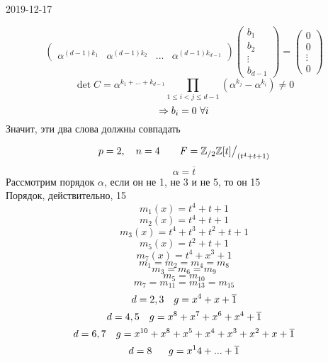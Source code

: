 \documentclass[12pt, fleqn]{article}
\begin{document}
\begin{lect}{2019-12-17}
\begin{Definition}
\[\begin{pmatrix}
            \\
            \alpha^{(d - 1)k_1} & \alpha^{(d - 1)k_2} & ... & \alpha^{(d - 1)k_{d - 1} }   
        \end{pmatrix} \begin{pmatrix}
            b_1\\
            b_2\\
            \vdots\\
            b_{d - 1} 
        \end{pmatrix} = \begin{pmatrix}
            0\\
            0\\
            \vdots\\
            0
        \end{pmatrix}\]
        \[\det C = \alpha^{k_1 + ... + k_{d - 1} } \prod_{1 \leq i < j \leq d - 1}(\alpha^{k_j} - \alpha^{k_i}) 
        \neq 0\]
        \[\Rightarrow b_i = 0 \ \forall i\]
        Значит, эти два слова должны совпадать
    \end{Definition}

    \begin{Example}
        \[p = 2, \quad n = 4 \qquad F = \mathbb{Z}_{/2}\mathbb{Z}[t]\big/_{(t^4 + t + 1)}  \]
        \[\alpha = \overline{t}\]
        Рассмотрим порядок $\alpha$, если он не 1, не 3 и не 5, то он 15\\
        Порядок, действительно, 15
        \[m_1(x) = t^4  + t + 1\]
        \[m_2(x) = t^4 + t + 1\]
        \[m_3(x) = t^4 + t^3 + t^2 + t + 1\]
        \[m_5(x) = t^2 + t + 1\]
        \[m_{7}(x) = t^4 + x^3 + 1 \]
        \[m_1 = m_2 = m_4 = m_8 \]
        \[m_3 = m_6 = m_9\]
        \[m_5 = m_{10} \]
        \[m_7 = m_{11}  = m_{13}  = m_{15} \]
        \[d = 2, 3 \quad g = x^4 + x + \overline{1}\]
        \[d = 4, 5 \quad g = x^8 + x^7 + x^6 + x^4 + \overline{1}\]
        \[d = 6, 7 \quad g = x^{10} + x^8 + x^5 + x^4 + x^3 + x^2 + x + \overline{1} \]
        \[d = 8 \ \ \quad g = x^14 + ... + \overline{1}\]
    \end{Example}
\end{lect}
\end{document}

